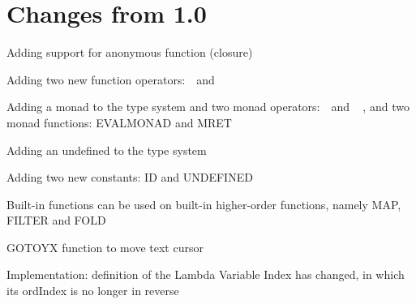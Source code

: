 \chapter{Changes from 1.0}

\begin{itemlist}
\item Adding support for anonymous function (closure)
\item Adding two new function operators: \basicapply\ \,and\ \,\basiccompo
\item Adding a monad to the type system and two monad operators: \basicmbind\ \,and\ \,\basicmseq\ , and two monad functions: EVALMONAD and MRET
\item Adding an undefined to the type system
\item Adding two new constants: ID and UNDEFINED
\item Built-in functions can be used on built-in higher-order functions, namely MAP, FILTER and FOLD
\item GOTOYX function to move text cursor
\item Implementation: definition of the Lambda Variable Index has changed, in which its ordIndex is no longer in reverse
\end{itemlist}
